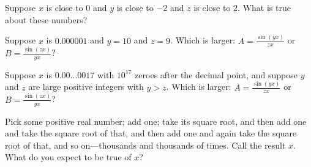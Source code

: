 \documentclass{ximera}
\begin{document}
\begin{shuffle}
\begin{problem}
  Suppose $x$ is close to $0$ and $y$ is close to $-2$ and $z$ is close to $2$.  What is true about these numbers?
  \begin{multipleChoice}
  \end{multipleChoice}
\end{problem}

\begin{problem}
  Suppose $x$ is $0.000001$ and $y = 10$ and $z = 9$.  Which is larger:
  $A = \frac{\sin (yx)}{zx}$ or $B = \frac{\sin (zx)}{yx}$?
  \begin{multipleChoice}
  \end{multipleChoice}
\end{problem}

\begin{problem}
  Suppose $x$ is $0.00\dots 0017$ with $10^{17}$ zeroes after the
  decimal point, and suppose $y$ and $z$ are large positive integers
  with $y > z$.  Which is larger: $A = \frac{\sin (yx)}{zx}$ or
  $B = \frac{\sin (zx)}{yx}$?
  \begin{multipleChoice}
  \end{multipleChoice}
\end{problem}

\begin{problem}
  Pick some positive real number; add one; take its square root, and
  then add one and take the square root of that, and then add one and
  again take the square root of that, and so on---thousands and
  thousands of times.  Call the result $x$.  What do you expect to be
  true of $x$?
  \begin{multipleChoice}
  \end{multipleChoice}
\end{problem}


\end{shuffle}
\end{document}
